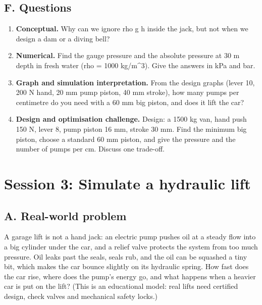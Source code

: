\documentclass[11pt,a4paper]{article}
\begin{document}
\subsection*{F. Questions}
\begin{enumerate}[nosep]
\item \textbf{Conceptual.} Why can we ignore rho g h inside the jack, but not when we design a dam or a diving bell?
\item \textbf{Numerical.} Find the gauge pressure and the absolute pressure at 30 m depth in fresh water (rho = 1000 kg/m\textasciicircum{}3). Give the answers in kPa and bar.
\item \textbf{Graph and simulation interpretation.} From the design graphs (lever 10, 200 N hand, 20 mm pump piston, 40 mm stroke), how many pumps per centimetre do you need with a 60 mm big piston, and does it lift the car?
\item \textbf{Design and optimisation challenge.} Design: a 1500 kg van, hand push 150 N, lever 8, pump piston 16 mm, stroke 30 mm. Find the minimum big piston, choose a standard 60 mm piston, and give the pressure and the number of pumps per cm. Discuss one trade-off.
\end{enumerate}

\section{Session 3: Simulate a hydraulic lift}

\subsection*{A. Real-world problem}
A garage lift is not a hand jack: an electric pump pushes oil at a steady flow into a big cylinder under the car, and a relief valve protects the system from too much pressure. Oil leaks past the seals, seals rub, and the oil can be squashed a tiny bit, which makes the car bounce slightly on its hydraulic spring. How fast does the car rise, where does the pump's energy go, and what happens when a heavier car is put on the lift? (This is an educational model: real lifts need certified design, check valves and mechanical safety locks.)
\end{document}
